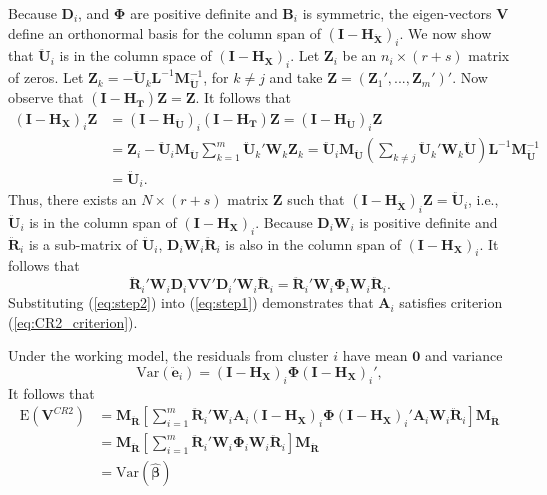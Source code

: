 \documentclass[12pt]{article}\usepackage[]{graphicx}\usepackage[]{color}
\newcommand{\E}{\text{E}}
\newcommand{\Var}{\text{Var}}
\newcommand{\bm}{\mathbf}
\newcommand{\bs}{\boldsymbol}
\begin{document}
Because $\bm{D}_i$, and $\bs\Phi$ are positive definite and $\bm{B}_i$ is symmetric, the eigen-vectors $\bm{V}$ define an orthonormal basis for the column span of $\left(\bm{I} - \bm{H_{\ddot{X}}}\right)_i$.
We now show that $\bm{\ddot{U}}_i$ is in the column space of $\left(\bm{I} - \bm{H_X}\right)_i$. 
Let $\bm{Z}_i$ be an $n_i \times (r + s)$ matrix of zeros. 
Let $\bm{Z}_k = - \bm{\ddot{U}}_k \bm{L}^{-1}\bm{M}_{\bm{\ddot{U}}}^{-1}$, for $k \neq j$ and take $\bm{Z} = \left(\bm{Z}_1',...,\bm{Z}_m'\right)'$. 
Now observe that $\left(\bm{I} - \bm{H_T}\right) \bm{Z} = \bm{Z}$. 
It follows that 
\begin{align*}
\left(\bm{I} - \bm{H_X}\right)_i \bm{Z} &= \left(\bm{I} - \bm{H_{\ddot{U}}}\right)_i \left(\bm{I} - \bm{H_T}\right) \bm{Z} = \left(\bm{I} - \bm{H_{\ddot{U}}}\right)_i \bm{Z} \\
&= \bm{Z}_i - \bm{\ddot{U}}_i\bm{M_{\ddot{U}}}\sum_{k=1}^m \bm{\ddot{U}}_k'\bm{W}_k\bm{Z}_k = \bm{\ddot{U}}_i\bm{M_{\ddot{U}}} \left(\sum_{k \neq j} \bm{\ddot{U}}_k' \bm{W}_k \bm{\ddot{U}} \right) \bm{L}^{-1}\bm{M}_{\bm{\ddot{U}}}^{-1} \\
&= \bm{\ddot{U}}_i.
\end{align*}
Thus, there exists an $N \times (r + s)$ matrix $\bm{Z}$ such that $\left(\bm{I} - \bm{H_{\ddot{X}}}\right)_i \bm{Z} = \bm{\ddot{U}}_i$, i.e., $\bm{\ddot{U}}_i$ is in the column span of $\left(\bm{I} - \bm{H_X}\right)_i$. Because $\bm{D}_i \bm{W}_i$ is positive definite and $\bm{\ddot{R}}_i$ is a sub-matrix of $\bm{\ddot{U}}_i$, $\bm{D}_i\bm{W}_i\bm{\ddot{R}}_i$ is also in the column span of $\left(\bm{I} - \bm{H_X}\right)_i$. It follows that 
\begin{equation}
\label{eq:step2}
\bm{\ddot{R}}_i' \bm{W}_i \bm{D}_i \bm{V}\bm{V}' \bm{D}_i' \bm{W}_i \bm{\ddot{R}}_i = \bm{\ddot{R}}_i' \bm{W}_i \bs\Phi_i \bm{W}_i \bm{\ddot{R}}_i.
\end{equation}
Substituting (\ref{eq:step2}) into (\ref{eq:step1}) demonstrates that $\bm{A}_i$ satisfies criterion (\ref{eq:CR2_criterion}).

Under the working model, the residuals from cluster $i$ have mean $\bm{0}$ and variance \[
\Var\left(\bm{\ddot{e}}_i\right) = \left(\bm{I} - \bm{H_X}\right)_i \bs\Phi \left(\bm{I} - \bm{H_X}\right)_i',\] 
It follows that 
\begin{align*}
\E\left(\bm{V}^{CR2}\right) &= \bm{M_{\ddot{R}}}\left[\sum_{i=1}^m \bm{\ddot{R}}_i' \bm{W}_i \bm{A}_i \left(\bm{I} - \bm{H_X}\right)_i \bs\Phi \left(\bm{I} - \bm{H_X}\right)_i' \bm{A}_i \bm{W}_i \bm{\ddot{R}}_i \right] \bm{M_{\ddot{R}}} \\
&= \bm{M_{\ddot{R}}}\left[\sum_{i=1}^m \bm{\ddot{R}}_i' \bm{W}_i \bs\Phi_i \bm{W}_i \bm{\ddot{R}}_i \right] \bm{M_{\ddot{R}}} \\
&= \Var\left(\bs{\hat\beta}\right)
\end{align*}
\end{document}
